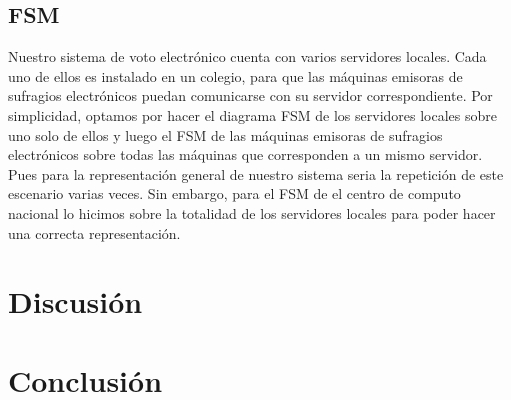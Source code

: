 \documentclass[spanish, 10pt,a4paper]{article}
\numberwithin{equation}{section} %
\begin{document}
\subsection{FSM}
Nuestro sistema de voto electr\'onico cuenta con varios servidores locales. Cada uno de ellos es instalado en un colegio, para que las m\'aquinas emisoras de sufragios electr\'onicos puedan comunicarse con su servidor correspondiente. Por simplicidad, optamos por hacer el diagrama FSM de los servidores locales sobre uno solo de ellos y luego el FSM de las m\'aquinas emisoras de sufragios electr\'onicos sobre todas las m\'aquinas que corresponden a un mismo servidor. Pues para la representación general de nuestro sistema seria la repetici\'on de este escenario varias veces. Sin embargo, para el FSM de el centro de computo nacional lo hicimos sobre la totalidad de los servidores locales para poder hacer una correcta representaci\'on.

\section{Discusión}
	
\section{Conclusión}

\end{document}

